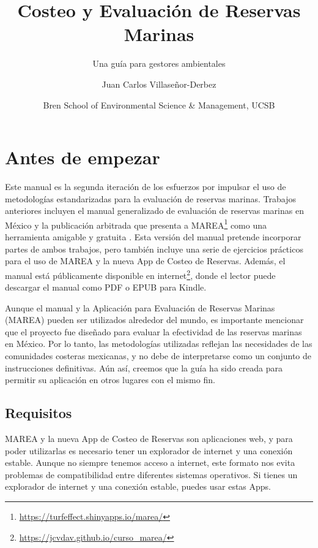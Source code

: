 \documentclass[]{krantz}
\title{Costeo y Evaluación de Reservas Marinas}
\subtitle{Una guía para gestores ambientales}
\author{Juan Carlos Villaseñor-Derbez}
\date{Bren School of Environmental Science \& Management, UCSB}
\renewcommand{\href}[2]{#2\footnote{\url{#1}}}
\begin{document}
\maketitle

{
\setcounter{tocdepth}{2}
\tableofcontents
}
\hypertarget{antes-de-empezar}{%
\chapter*{Antes de empezar}\label{antes-de-empezar}}


Este manual es la segunda iteración de los esfuerzos por impulsar el uso
de metodologías estandarizadas para la evaluación de reservas marinas.
Trabajos anteriores incluyen el manual generalizado de evaluación de
reservas marinas en México \citep{villaseorderbez_2017} y la publicación
arbitrada que presenta a
\href{https://turfeffect.shinyapps.io/marea/}{MAREA} como una
herramienta amigable y gratuita \citep{villasenorderbez_2018}. Esta
versión del manual pretende incorporar partes de ambos trabajos, pero
también incluye una serie de ejercicios prácticos para el uso de MAREA y
la nueva App de Costeo de Reservas. Además, el manual está públicamente
disponible en \href{https://jcvdav.github.io/curso_marea/}{internet},
donde el lector puede descargar el manual como PDF o EPUB para Kindle.

Aunque el manual y la Aplicación para Evaluación de Reservas Marinas
(MAREA) pueden ser utilizados alrededor del mundo, es importante
mencionar que el proyecto fue diseñado para evaluar la efectividad de
las reservas marinas en México. Por lo tanto, las metodologías
utilizadas reflejan las necesidades de las comunidades costeras
mexicanas, y no debe de interpretarse como un conjunto de instrucciones
definitivas. Aún así, creemos que la guía ha sido creada para permitir
su aplicación en otros lugares con el mismo fin.

\hypertarget{requisitos}{%
\section{Requisitos}\label{requisitos}}

MAREA y la nueva App de Costeo de Reservas son aplicaciones web, y para
poder utilizarlas es necesario tener un explorador de internet y una
conexión estable. Aunque no siempre tenemos acceso a internet, este
formato nos evita problemas de compatibilidad entre diferentes sistemas
operativos. Si tienes un explorador de internet y una conexión estable,
puedes usar estas Apps.
\end{document}
